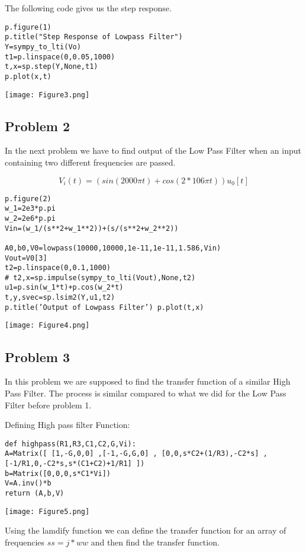 \documentclass[10pt,english, openany]{book}
\begin{document}
The following code gives us the step response.

\begin{verbatim}
p.figure(1)
p.title("Step Response of Lowpass Filter") 
Y=sympy_to_lti(Vo)
t1=p.linspace(0,0.05,1000) 
t,x=sp.step(Y,None,t1)
p.plot(x,t)
\end{verbatim}

{\centering \texttt{[image: Figure3.png]}}


\subsection{Problem 2}

In the next problem we have to find output of the Low Pass Filter when an input containing two different frequencies are passed.

\begin{equation*}
V_{i}(t) = (sin(2000 \pi  t) + cos(2 *106\pi t))u_{0}[t]
\end{equation*}
\begin{verbatim}
p.figure(2)
w_1=2e3*p.pi
w_2=2e6*p.pi 
Vin=(w_1/(s**2+w_1**2))+(s/(s**2+w_2**2)) 

A0,b0,V0=lowpass(10000,10000,1e-11,1e-11,1.586,Vin) 
Vout=V0[3]
t2=p.linspace(0,0.1,1000)
# t2,x=sp.impulse(sympy_to_lti(Vout),None,t2)
u1=p.sin(w_1*t)+p.cos(w_2*t) 
t,y,svec=sp.lsim2(Y,u1,t2)
p.title(’Output of Lowpass Filter’) p.plot(t,x)
\end{verbatim}

{\centering \texttt{[image: Figure4.png]}}

\subsection{Problem 3}

In this problem we are supposed to find the transfer function of a similar High Pass Filter. The process is similar compared to what we did for the Low Pass Filter before problem 1.


Defining High pass filter Function:
\begin{verbatim}
def highpass(R1,R3,C1,C2,G,Vi):
A=Matrix([ [1,-G,0,0] ,[-1,-G,G,0] , [0,0,s*C2+(1/R3),-C2*s] ,
[-1/R1,0,-C2*s,s*(C1+C2)+1/R1] ]) 
b=Matrix([0,0,0,s*C1*Vi])
V=A.inv()*b
return (A,b,V)
\end{verbatim}
{\centering \texttt{[image: Figure5.png]}}

Using the lamdify function we can define the transfer function for an array of frequencies $ss=j*ww$ and then find the transfer function.
\end{document}
